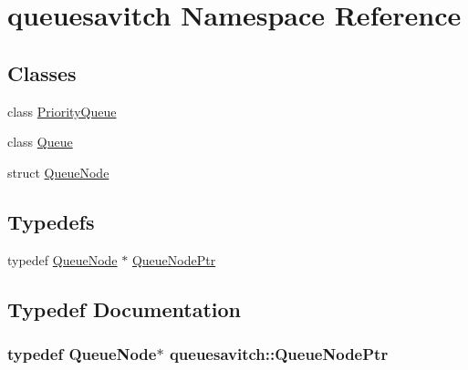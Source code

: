 \hypertarget{namespacequeuesavitch}{}\section{queuesavitch Namespace Reference}
\label{namespacequeuesavitch}
\subsection*{Classes}
\begin{DoxyCompactItemize}
\item 
class \hyperlink{classqueuesavitch_1_1PriorityQueue}{Priority\+Queue}
\item 
class \hyperlink{classqueuesavitch_1_1Queue}{Queue}
\item 
struct \hyperlink{structqueuesavitch_1_1QueueNode}{Queue\+Node}
\end{DoxyCompactItemize}
\subsection*{Typedefs}
\begin{DoxyCompactItemize}
\item 
typedef \hyperlink{structqueuesavitch_1_1QueueNode}{Queue\+Node} $\ast$ \hyperlink{namespacequeuesavitch_a3a9d48cafb7ea2049936da3b05a10209}{Queue\+Node\+Ptr}
\end{DoxyCompactItemize}


\subsection{Typedef Documentation}
\subsubsection[{\texorpdfstring{Queue\+Node\+Ptr}{QueueNodePtr}}]{\setlength{\rightskip}{0pt plus 5cm}typedef {\bf Queue\+Node}$\ast$ {\bf queuesavitch\+::\+Queue\+Node\+Ptr}}\hypertarget{namespacequeuesavitch_a3a9d48cafb7ea2049936da3b05a10209}{}\label{namespacequeuesavitch_a3a9d48cafb7ea2049936da3b05a10209}

